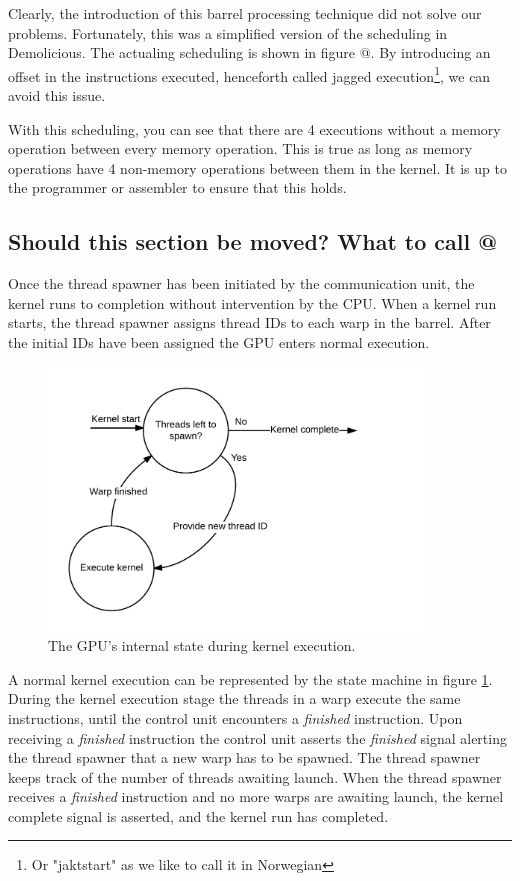 \documentclass[../main/report.tex]{subfiles}
\begin{document}
Clearly, the introduction of this barrel processing technique did not solve our problems.
Fortunately, this was a simplified version of the scheduling in Demolicious. 
The actualing scheduling is shown in figure @. 
By introducing an offset in the instructions executed, henceforth called jagged execution\footnote{Or "jaktstart" as we like to call it in Norwegian}, we can avoid this issue.

With this scheduling, you can see that there are 4 executions without a memory operation between every memory operation.
This is true as long as memory operations have 4 non-memory operations between them in the kernel.
It is up to the programmer or assembler to ensure that this holds.


\subsection{Should this section be moved? What to call @}

Once the thread spawner has been initiated by the communication unit, the kernel runs to completion without intervention by the CPU. 
When a kernel run starts, the thread spawner assigns thread IDs to each warp in the barrel.
After the initial IDs have been assigned the GPU enters normal execution.
\begin{figure}[H]
    \centering
    \includegraphics[width=0.9\textwidth]{../gpu/diagrams/kernel_run_state_machine.png}
    \caption{The GPU's internal state during kernel execution.}
    \label{fig:kernel_run_state_machine}
\end{figure}
A normal kernel execution can be represented by the state machine in figure \ref{fig:kernel_run_state_machine}.
During the kernel execution stage the threads in a warp execute the same instructions, until the control unit encounters a \emph{finished} instruction.
Upon receiving a \emph{finished} instruction the control unit asserts the \emph{finished} signal alerting the thread spawner that a new warp has to be spawned.
The thread spawner keeps track of the number of threads awaiting launch.
When the thread spawner receives a \emph{finished} instruction and no more warps are awaiting launch, the kernel complete signal is asserted, and the kernel run has completed.
\end{document}
